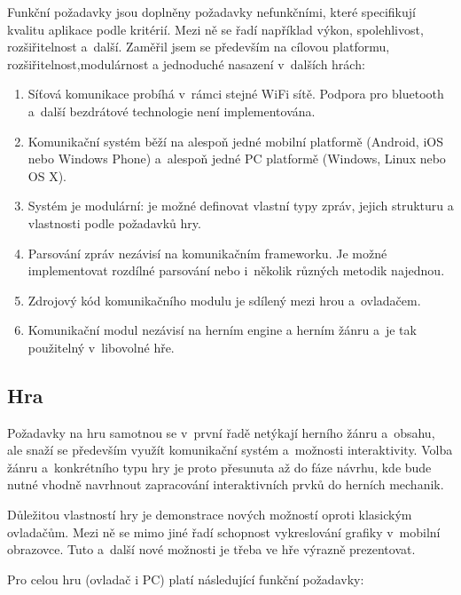 \documentclass[thesis=B,czech,hidelinks]{FITthesis}[2012/06/26] %
\begin{document}
Funkční požadavky jsou doplněny požadavky nefunkčními, které specifikují kvalitu aplikace podle kritérií. Mezi ně se řadí například výkon, spolehlivost, rozšiřitelnost a~další. Zaměřil jsem se především na cílovou platformu, rozšiřitelnost,modulárnost a jednoduché nasazení v~dalších hrách:

\begin{enumerate}
	\item Síťová komunikace probíhá v~rámci stejné WiFi sítě. Podpora pro bluetooth a~další bezdrátové technologie není implementována.
	\item Komunikační systém běží na alespoň jedné mobilní platformě (Android, iOS nebo Windows Phone) a~alespoň jedné PC platformě (Windows, Linux nebo OS X).
	\item Systém je modulární: je možné definovat vlastní typy zpráv, jejich strukturu a vlastnosti podle požadavků hry.
	\item Parsování zpráv nezávisí na komunikačním frameworku. Je možné implementovat rozdílné parsování nebo i~několik různých metodik najednou.
	\item Zdrojový kód komunikačního modulu je sdílený mezi hrou a~ovladačem.
	\item Komunikační modul nezávisí na herním engine a herním žánru a~je tak použitelný v~libovolné hře.
\end{enumerate}

\subsection{Hra}

Požadavky na hru samotnou se v~první řadě netýkají herního žánru a~obsahu, ale snaží se především využít komunikační systém a~možnosti interaktivity. Volba žánru a~konkrétního typu hry je proto přesunuta až do fáze návrhu, kde bude nutné vhodně navrhnout zapracování interaktivních prvků do herních mechanik.

Důležitou vlastností hry je demonstrace nových možností oproti klasickým ovladačům. Mezi ně se mimo jiné řadí schopnost vykreslování grafiky v~mobilní obrazovce. Tuto a~další nové možnosti je třeba ve hře 
výrazně prezentovat.

Pro celou hru (ovladač i PC) platí následující funkční požadavky:
\end{document}
